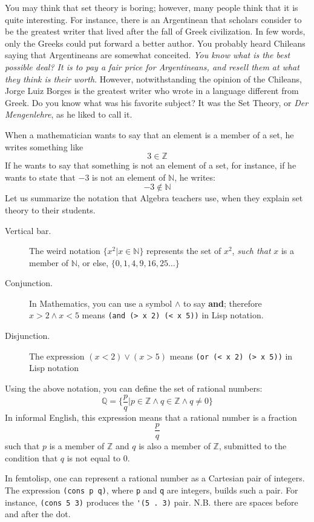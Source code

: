 \documentclass[a4paper,12pt]{book}
\begin{document}
You may think that set theory is boring; however, many people think that it is quite interesting. For instance, there is an Argentinean that scholars consider to be the greatest writer that lived after the fall of Greek civilization. In few words, only the Greeks could put forward a better author. You probably heard Chileans saying  that Argentineans are somewhat conceited. {\em You know what is the best possible deal? It is to pay a fair price for Argentineans, and resell them at what they think is their worth}. However, notwithstanding the opinion of the Chileans, Jorge Luiz Borges is the greatest writer who wrote in a language different from Greek.
Do you know what was his favorite subject? It was the Set Theory, or {\em Der Mengenlehre}, as he liked to call it.

When a mathematician wants to say that an element is a member of a set, he writes something like
$$3  \in \mathbb{Z}$$
If he wants to say that something is not an element of a set, for instance, if he wants to state that $-3$ is not an element of $\mathbb{N}$, he writes:
$$-3  \notin  \mathbb{N}$$
Let us summarize the notation that Algebra teachers use, when they explain set theory to their students.
\begin{description}
\item[Vertical bar.] The weird notation $\{x^2 | x \in \mathbb{N}\}$
represents the set of
$x^2$, {\em such that} $x$ is a member of $\mathbb{N}$, or else,
$\{0, 1, 4, 9, 16, 25\ldots\}$
\item[Conjunction.] In Mathematics, you can use a symbol $\wedge$
to say {\bf\small and}; therefore $x>2 \wedge x<5$ means 
\verb|(and (> x 2) (< x 5))| in Lisp notation.
\item[Disjunction.] The expression
$(x<2) \vee (x>5)$
means \verb|(or (< x 2) (> x 5))| in Lisp notation
\end{description}
Using the above notation, you can define the set of rational numbers:
$$\mathbb{Q}=\{\frac{p}{q} | p \in \mathbb{Z} \wedge q \in \mathbb{Z} 
\wedge q \neq 0\}$$
In informal English, this expression means that a rational number is a fraction $$\frac{p}{q}$$ such that $p$ is a member of $\mathbb{Z}$ and $q$ is also a member of $\mathbb{Z}$, submitted to the condition that $q$ is not equal to $0$.

In femtolisp, one can represent a rational number
as a Cartesian pair of integers. The expression \verb|(cons p q)|,
where \verb|p| and \verb|q| are integers, builds such a pair.
For instance, \verb|(cons 5 3)| produces the
\verb|'(5 . 3)| pair. N.B. there
are spaces before and after the dot.\label{page:cartesian-pair}
\end{document}
